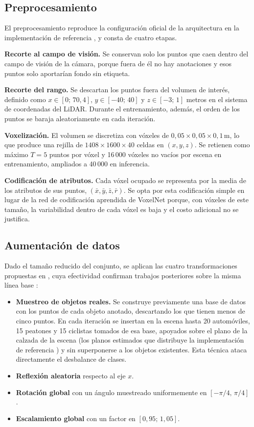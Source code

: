 \documentclass[11pt,letterpaper]{article}
\begin{document}
\subsection{Preprocesamiento}

El preprocesamiento reproduce la configuración oficial de la arquitectura \cite{yan2018} en la implementación de referencia \cite{openpcdet}, y consta de cuatro etapas.

\textbf{Recorte al campo de visión.} Se conservan solo los puntos que caen dentro del campo de visión de la cámara, porque fuera de él no hay anotaciones y esos puntos solo aportarían fondo sin etiqueta.

\textbf{Recorte del rango.} Se descartan los puntos fuera del volumen de interés, definido como $x \in [0;\, 70{,}4]$, $y \in [-40;\, 40]$ y $z \in [-3;\, 1]$ metros en el sistema de coordenadas del LiDAR. Durante el entrenamiento, además, el orden de los puntos se baraja aleatoriamente en cada iteración.

\textbf{Voxelización.} El volumen se discretiza con vóxeles de $0{,}05 \times 0{,}05 \times 0{,}1$\,m, lo que produce una rejilla de $1408 \times 1600 \times 40$ celdas en $(x, y, z)$. Se retienen como máximo $T = 5$ puntos por vóxel y 16\,000 vóxeles no vacíos por escena en entrenamiento, ampliados a 40\,000 en inferencia.

\textbf{Codificación de atributos.} Cada vóxel ocupado se representa por la media de los atributos de sus puntos, $(\bar{x}, \bar{y}, \bar{z}, \bar{r})$. Se opta por esta codificación simple en lugar de la red de codificación aprendida de VoxelNet \cite{zhou2018} porque, con vóxeles de este tamaño, la variabilidad dentro de cada vóxel es baja y el costo adicional no se justifica.

\subsection{Aumentación de datos}

Dado el tamaño reducido del conjunto, se aplican las cuatro transformaciones propuestas en \cite{yan2018}, cuya efectividad confirman trabajos posteriores sobre la misma línea base \cite{ke2025, ao2026}:

\begin{itemize}
\item \textbf{Muestreo de objetos reales.} Se construye previamente una base de datos con los puntos de cada objeto anotado, descartando los que tienen menos de cinco puntos. En cada iteración se insertan en la escena hasta 20 automóviles, 15 peatones y 15 ciclistas tomados de esa base, apoyados sobre el plano de la calzada de la escena (los planos estimados que distribuye la implementación de referencia \cite{openpcdet}) y sin superponerse a los objetos existentes. Esta técnica ataca directamente el desbalance de clases.
\item \textbf{Reflexión aleatoria} respecto al eje $x$.
\item \textbf{Rotación global} con un ángulo muestreado uniformemente en $[-\pi/4,\, \pi/4]$.
\item \textbf{Escalamiento global} con un factor en $[0{,}95;\, 1{,}05]$.
\end{itemize}
\end{document}
